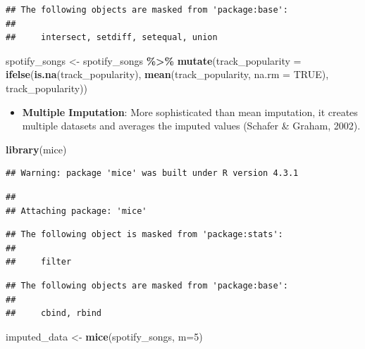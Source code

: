 \documentclass[
  b5paper]{book}
\newenvironment{Shaded}{\begin{snugshade}}{\end{snugshade}}
\newcommand{\AttributeTok}[1]{\textcolor[rgb]{0.13,0.29,0.53}{#1}}
\newcommand{\ConstantTok}[1]{\textcolor[rgb]{0.56,0.35,0.01}{#1}}
\newcommand{\DecValTok}[1]{\textcolor[rgb]{0.00,0.00,0.81}{#1}}
\newcommand{\FunctionTok}[1]{\textcolor[rgb]{0.13,0.29,0.53}{\textbf{#1}}}
\newcommand{\NormalTok}[1]{#1}
\newcommand{\OtherTok}[1]{\textcolor[rgb]{0.56,0.35,0.01}{#1}}
\newcommand{\SpecialCharTok}[1]{\textcolor[rgb]{0.81,0.36,0.00}{\textbf{#1}}}
\providecommand{\tightlist}{%
  \setlength{\itemsep}{0pt}\setlength{\parskip}{0pt}}
\begin{document}
\begin{verbatim}
## The following objects are masked from 'package:base':
## 
##     intersect, setdiff, setequal, union
\end{verbatim}

\begin{Shaded}
\begin{Highlighting}[]
\NormalTok{spotify\_songs }\OtherTok{\textless{}{-}}\NormalTok{ spotify\_songs }\SpecialCharTok{\%\textgreater{}\%}
  \FunctionTok{mutate}\NormalTok{(}\AttributeTok{track\_popularity =} \FunctionTok{ifelse}\NormalTok{(}\FunctionTok{is.na}\NormalTok{(track\_popularity), }\FunctionTok{mean}\NormalTok{(track\_popularity, }\AttributeTok{na.rm =} \ConstantTok{TRUE}\NormalTok{), track\_popularity))}
\end{Highlighting}
\end{Shaded}

\begin{itemize}
\tightlist
\item
  \textbf{Multiple Imputation}: More sophisticated than mean imputation, it creates multiple datasets and averages the imputed values (Schafer \& Graham, 2002).
\end{itemize}

\begin{Shaded}
\begin{Highlighting}[]
\FunctionTok{library}\NormalTok{(mice)}
\end{Highlighting}
\end{Shaded}

\begin{verbatim}
## Warning: package 'mice' was built under R version 4.3.1
\end{verbatim}

\begin{verbatim}
## 
## Attaching package: 'mice'
\end{verbatim}

\begin{verbatim}
## The following object is masked from 'package:stats':
## 
##     filter
\end{verbatim}

\begin{verbatim}
## The following objects are masked from 'package:base':
## 
##     cbind, rbind
\end{verbatim}

\begin{Shaded}
\begin{Highlighting}[]
\NormalTok{imputed\_data }\OtherTok{\textless{}{-}} \FunctionTok{mice}\NormalTok{(spotify\_songs, }\AttributeTok{m=}\DecValTok{5}\NormalTok{)}
\end{Highlighting}
\end{Shaded}
\end{document}
